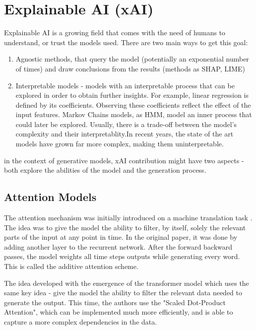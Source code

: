 \section{Explainable AI (xAI)}

Explainable AI is a growing field that comes with the need of humans to understand, or trust the models used. There are two main ways to get this goal:

\begin{enumerate}
	\item Agnostic methods, that query the model (potentially an exponential number of times) and draw conclusions from the results (methods as SHAP, LIME)

	\item Interpretable models - models with an interpretable process that can be explored in order to obtain further insights. For example, linear regression is defined by its coefficients. Observing these coefficients reflect the effect of the input features. Markov Chains models, as HMM, model an inner process that could later be explored. Usually, there is a trade-off between the model's complexity and their interpretablity.In recent years, the state of the art models have grown far more complex, making them uninterpretable.

\end{enumerate}


in the context of generative models, xAI contribution might have two aspects - both explore the abilities of the model and the generation process.

\subsection{Attention Models}

The attention mechanism was initially introduced on a machine translation task \cite{7}. The idea was to give the model the ability to filter, by itself, solely the relevant parts of the input at any point in time. In the original paper, it was done by adding another layer to the recurrent network. After the forward backward passes, the model weights all time steps outputs while generating every word. This is called the additive attention scheme.


The idea developed with the emergence of the transformer model \cite{8} which uses the same key idea - give the model the ability to filter the relevant data needed to generate the output. This time, the authors use the "Scaled Dot-Product Attention", which can be implemented much more efficiently, and is able to capture a more complex dependencies in the data.

